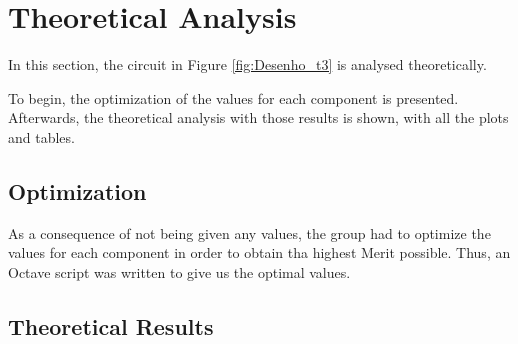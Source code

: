 
\section{Theoretical Analysis}
\label{sec:analysis}



In this section, the circuit in Figure \ref{fig:Desenho_t3} is analysed theoretically.

To begin, the optimization of the values for each component is presented. Afterwards,
the theoretical analysis with those results is shown, with all the plots and tables.



\subsection{Optimization}
\label{subsec:optim}

As a consequence of not being given any values, the group had to optimize the values
for each component in order to obtain tha highest Merit possible. Thus, an Octave script
was written to give us the optimal values.



\subsection{Theoretical Results}
\label{subsec:res_the}


